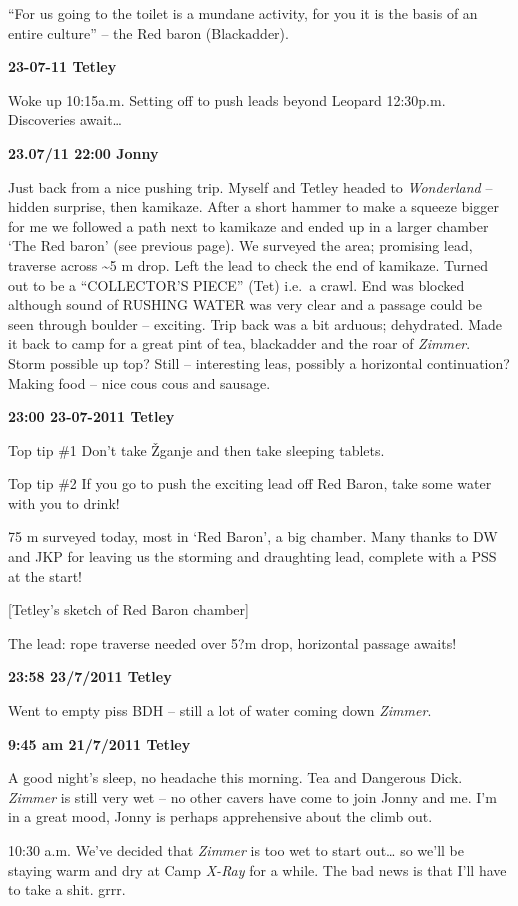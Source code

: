 ``For us going to the toilet is a mundane activity, for you it is the
basis of an entire culture'' -- the Red baron (Blackadder).

\textbf{23-07-11 Tetley}

Woke up 10:15a.m. Setting off to push leads beyond Leopard 12:30p.m.
Discoveries await\ldots{}

\textbf{23.07/11 22:00 Jonny}

Just back from a nice pushing trip. Myself and Tetley headed to
\emph{Wonderland} -- hidden surprise, then kamikaze. After a short
hammer to make a squeeze bigger for me we followed a path next to
kamikaze and ended up in a larger chamber `The Red baron' (see previous
page). We surveyed the area; promising lead, traverse across
\textasciitilde 5 m drop. Left the lead to check the end of kamikaze.
Turned out to be a ``COLLECTOR'S PIECE'' (Tet) i.e.~a crawl. End was
blocked although sound of RUSHING WATER was very clear and a passage
could be seen through boulder -- exciting. Trip back was a bit arduous;
dehydrated. Made it back to camp for a great pint of tea, blackadder and
the roar of \emph{Zimmer}. Storm possible up top? Still -- interesting
leas, possibly a horizontal continuation? Making food -- nice cous cous
and sausage.

\textbf{23:00 23-07-2011 Tetley}

Top tip \#1 Don't take Žganje and then take sleeping tablets.

Top tip \#2 If you go to push the exciting lead off Red Baron, take some
water with you to drink!

75 m surveyed today, most in `Red Baron', a big chamber. Many thanks to
DW and JKP for leaving us the storming and draughting lead, complete
with a PSS at the start!

{[}Tetley's sketch of Red Baron chamber{]}

The lead: rope traverse needed over 5?m drop, horizontal passage awaits!

\textbf{23:58 23/7/2011 Tetley}

Went to empty piss BDH -- still a lot of water coming down
\emph{Zimmer}.

\textbf{9:45 am 21/7/2011 Tetley}

A good night's sleep, no headache this morning. Tea and Dangerous Dick.
\emph{Zimmer} is still very wet -- no other cavers have come to join
Jonny and me. I'm in a great mood, Jonny is perhaps apprehensive about
the climb out.

10:30 a.m. We've decided that \emph{Zimmer} is too wet to start
out\ldots{} so we'll be staying warm and dry at Camp \emph{X-Ray} for a
while. The bad news is that I'll have to take a shit. grrr.

